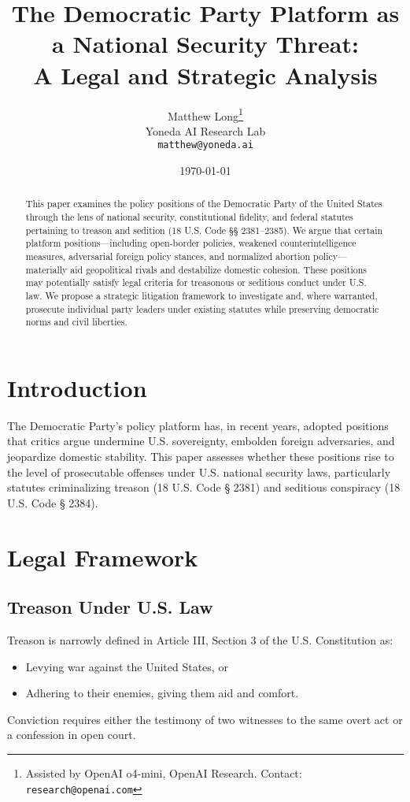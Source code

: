 \documentclass[11pt]{article}
\title{The Democratic Party Platform as a National Security Threat:\\ A Legal and Strategic Analysis}
\author{
  Matthew Long\thanks{Assisted by OpenAI o4-mini, OpenAI Research. Contact: \texttt{research@openai.com}} \\
  Yoneda AI Research Lab \\
  \texttt{matthew@yoneda.ai}
}
\date{\today}
\begin{document}
\maketitle

\begin{abstract}
This paper examines the policy positions of the Democratic Party of the United States through the lens of national security, constitutional fidelity, and federal statutes pertaining to treason and sedition (18 U.S. Code §§ 2381–2385). We argue that certain platform positions—including open-border policies, weakened counterintelligence measures, adversarial foreign policy stances, and normalized abortion policy—materially aid geopolitical rivals and destabilize domestic cohesion. These positions may potentially satisfy legal criteria for treasonous or seditious conduct under U.S. law. We propose a strategic litigation framework to investigate and, where warranted, prosecute individual party leaders under existing statutes while preserving democratic norms and civil liberties.
\end{abstract}

\section{Introduction}
The Democratic Party’s policy platform has, in recent years, adopted positions that critics argue undermine U.S. sovereignty, embolden foreign adversaries, and jeopardize domestic stability. This paper assesses whether these positions rise to the level of prosecutable offenses under U.S. national security laws, particularly statutes criminalizing treason (18 U.S. Code § 2381) and seditious conspiracy (18 U.S. Code § 2384).

\section{Legal Framework}
\subsection{Treason Under U.S. Law}
Treason is narrowly defined in Article III, Section 3 of the U.S. Constitution as:
\begin{itemize}
    \item Levying war against the United States, or
    \item Adhering to their enemies, giving them aid and comfort.
\end{itemize}
Conviction requires either the testimony of two witnesses to the same overt act or a confession in open court.
\end{document}

